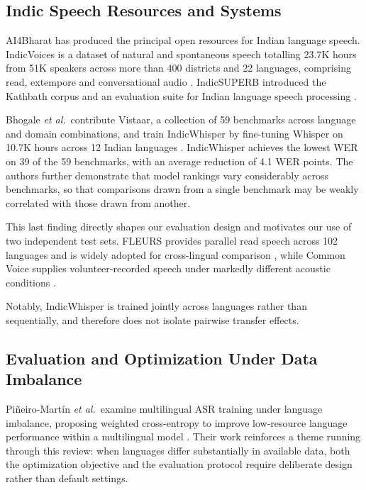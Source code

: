 \documentclass[conference]{IEEEtran}
\begin{document}
\subsection{Indic Speech Resources and Systems}

AI4Bharat has produced the principal open resources for Indian language
speech. IndicVoices is a dataset of natural and spontaneous speech
totalling 23.7K hours from 51K speakers across more than 400 districts
and 22 languages, comprising read, extempore and conversational audio
\cite{javed2024indicvoices}. IndicSUPERB introduced the Kathbath corpus
and an evaluation suite for Indian language speech processing
\cite{javed2023indicsuperb}.

Bhogale \emph{et al.}\ contribute Vistaar, a collection of 59 benchmarks
across language and domain combinations, and train IndicWhisper by
fine-tuning Whisper on 10.7K hours across 12 Indian languages
\cite{bhogale2023vistaar}. IndicWhisper achieves the lowest WER on 39 of
the 59 benchmarks, with an average reduction of 4.1 WER points. The
authors further demonstrate that model rankings vary considerably across
benchmarks, so that comparisons drawn from a single benchmark may be
weakly correlated with those drawn from another.

This last finding directly shapes our evaluation design and motivates
our use of two independent test sets. FLEURS provides parallel read
speech across 102 languages and is widely adopted for cross-lingual
comparison \cite{conneau2023fleurs}, while Common Voice supplies
volunteer-recorded speech under markedly different acoustic conditions
\cite{ardila2020commonvoice}.

Notably, IndicWhisper is trained jointly across languages rather than
sequentially, and therefore does not isolate pairwise transfer effects.

\subsection{Evaluation and Optimization Under Data Imbalance}

Pi\~{n}eiro-Mart\'{i}n \emph{et al.}\ examine multilingual ASR training
under language imbalance, proposing weighted cross-entropy to improve
low-resource language performance within a multilingual model
\cite{pineiro2024weighted}. Their work reinforces a theme running
through this review: when languages differ substantially in available
data, both the optimization objective and the evaluation protocol
require deliberate design rather than default settings.
\end{document}
